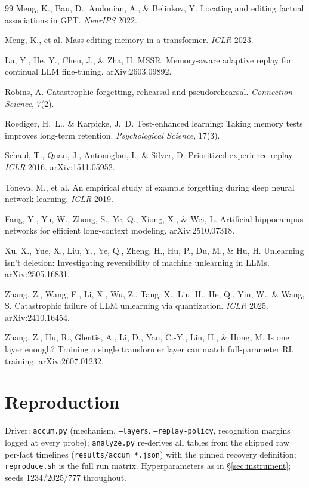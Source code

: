 \documentclass[11pt]{article}
\begin{document}
\begin{thebibliography}{99}
 Meng, K., Bau, D., Andonian, A., \& Belinkov, Y. Locating
and editing factual associations in GPT. \emph{NeurIPS} 2022.

 Meng, K., et al. Mass-editing memory in a transformer.
\emph{ICLR} 2023.

 Lu, Y., He, Y., Chen, J., \& Zha, H. MSSR: Memory-aware
adaptive replay for continual LLM fine-tuning. arXiv:2603.09892.

 Robins, A. Catastrophic forgetting, rehearsal and pseudorehearsal.
\emph{Connection Science}, 7(2).

 Roediger, H.~L., \& Karpicke, J.~D. Test-enhanced
learning: Taking memory tests improves long-term retention. \emph{Psychological Science}, 17(3).

 Schaul, T., Quan, J., Antonoglou, I., \& Silver, D.
Prioritized experience replay. \emph{ICLR} 2016. arXiv:1511.05952.

 Toneva, M., et al. An empirical study of example forgetting
during deep neural network learning. \emph{ICLR} 2019.

 Fang, Y., Yu, W., Zhong, S., Ye, Q., Xiong, X., \& Wei, L.
Artificial hippocampus networks for efficient long-context modeling. arXiv:2510.07318.

 Xu, X., Yue, X., Liu, Y., Ye, Q., Zheng, H., Hu, P.,
Du, M., \& Hu, H. Unlearning isn't deletion: Investigating reversibility of machine unlearning in
LLMs. arXiv:2505.16831.

 Zhang, Z., Wang, F., Li, X., Wu, Z., Tang, X.,
Liu, H., He, Q., Yin, W., \& Wang, S. Catastrophic failure of LLM unlearning via quantization.
\emph{ICLR} 2025. arXiv:2410.16454.

 Zhang, Z., Hu, R., Glentis, A., Li, D., Yau, C.-Y.,
Lin, H., \& Hong, M. Is one layer enough? Training a single transformer layer can match
full-parameter RL training. arXiv:2607.01232.

\end{thebibliography}

\appendix
\section{Reproduction}
Driver: \texttt{accum.py} (mechanism, \texttt{--layers}, \texttt{--replay-policy}, recognition
margins logged at every probe); \texttt{analyze.py} re-derives all tables from the shipped raw
per-fact timelines (\texttt{results/accum\_*.json}) with the pinned recovery definition;
\texttt{reproduce.sh} is the full run matrix. Hyperparameters as in \S\ref{sec:instrument}; seeds
1234/2025/777 throughout.
\end{document}
